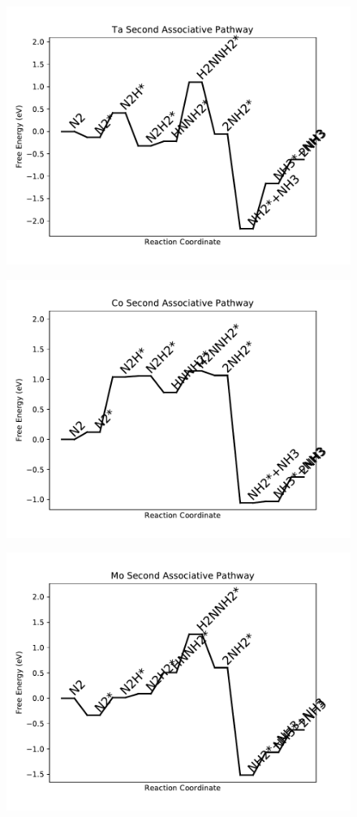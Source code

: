 \begin{figure}
\includegraphics[width=0.8\linewidth]{data/plots/Ta_associative_2.pdf}
\end{figure}

\begin{figure}
\includegraphics[width=0.8\linewidth]{data/plots/Co_associative_2.pdf}
\end{figure}

\begin{figure}
\includegraphics[width=0.8\linewidth]{data/plots/Mo_associative_2.pdf}
\end{figure}

